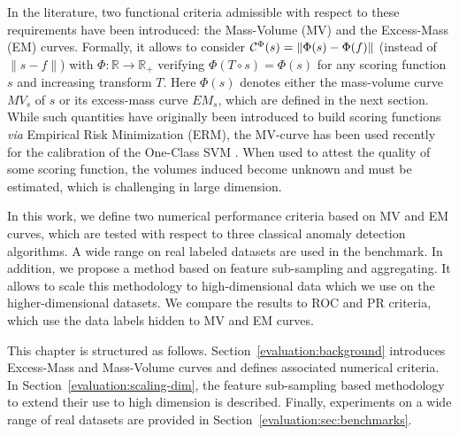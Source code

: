 In the literature, two functional criteria admissible with respect to these requirements have been introduced: the Mass-Volume (MV) \citep{CLEM13,CLEM14} and the Excess-Mass (EM) \citep{AISTAT15} curves.
Formally, it allows to consider $\mathcal{C}^{\Phi}(s) = \| \Phi(s) - \Phi(f) \|$ (instead of $\|s - f\|$) %
with $\Phi: \mathbb{R} \to \mathbb{R}_+$ verifying $\Phi(T \circ s) = \Phi(s)$ 
for any scoring function $s$ and increasing transform $T$. Here $\Phi(s)$ denotes either the mass-volume curve $MV_s$ of $s$ or its excess-mass curve $EM_s$, which are defined in the next section.  
While such quantities have originally been introduced to build scoring functions \emph{via}
Empirical Risk Minimization (ERM), the MV-curve has been used recently for the calibration of the One-Class SVM \citep{Thomas2015}.
When used to attest the quality of some scoring function, the volumes induced become unknown and must be estimated, which is challenging in large dimension.

In this work, we define two numerical performance criteria based on MV and EM curves, which are tested with respect to three classical anomaly detection algorithms. A wide range on real labeled datasets are used in the benchmark. In addition, we propose a method based on feature sub-sampling and aggregating. It allows to scale %
 this methodology to high-dimensional data which we use on the higher-dimensional datasets. We compare the results to ROC and PR criteria, which use the data labels hidden to MV and EM curves. 

 This chapter is structured as follows. Section~\ref{evaluation:background} introduces Excess-Mass and Mass-Volume curves and defines associated numerical criteria. In Section~\ref{evaluation:scaling-dim}, the feature sub-sampling based methodology to extend their use to high dimension is described. Finally, experiments on a wide range of real datasets are provided in Section~\ref{evaluation:sec:benchmarks}.


